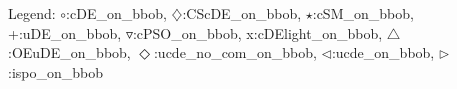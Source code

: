 Legend: {\color{CornflowerBlue}$\circ$}:cDE\_on\_bbob, {{}$\diamondsuit$}:CScDE\_on\_bbob, {\color{Green}$\star$}:cSM\_on\_bbob, {\color{red}+}:uDE\_on\_bbob, {\color{brown}$\triangledown$}:cPSO\_on\_bbob, {{}x}:cDElight\_on\_bbob, {{}$\triangle$}:OEuDE\_on\_bbob, {{}$\Diamond$}:ucde\_no\_com\_on\_bbob, {{}$\triangleleft$}:ucde\_on\_bbob, {{}$\triangleright$}:ispo\_on\_bbob